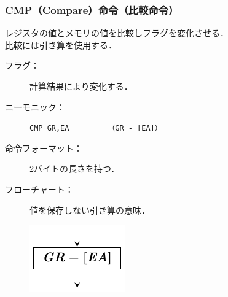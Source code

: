 \documentclass{beamer}                 %
\begin{document}
\begin{frame}
  \frametitle{CMP（Compare）命令（比較命令）}
  レジスタの値とメモリの値を比較しフラグを変化させる．\\
  比較には引き算を使用する．
  \vfill
  \begin{description}
  \item[フラグ：] 計算結果により変化する．
    \vfill

  \item[ニーモニック：]\texttt{CMP GR,EA}~~~~~~~~~\texttt{（GR - [EA]）}
    \vfill

  \item[命令フォーマット：] 2バイトの長さを持つ．\\
    \vfill

  \item[フローチャート：] 値を保存しない引き算の意味．\\
    \centerline{\includegraphics[scale=0.7]{../Tikz/cmp.pdf}}
  \end{description}
  \vfill
\end{frame}
\end{document}
